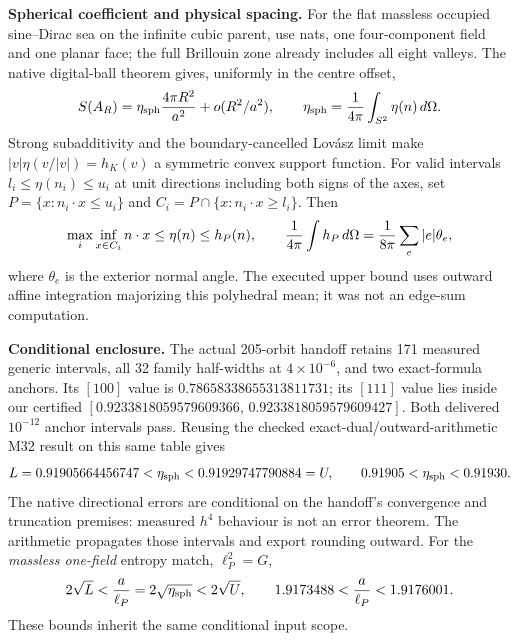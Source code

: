 
\noindent\textbf{Spherical coefficient and physical spacing.}
For the flat massless occupied sine--Dirac sea on the infinite cubic
parent, use nats, one four-component field and one planar face; the full
Brillouin zone already includes all eight valleys. The native digital-ball
theorem gives, uniformly in the centre offset,
\[
 S(A_R)=\eta_{\rm sph}{4\pi R^2\over a^2}+o(R^2/a^2),\qquad
 \eta_{\rm sph}={1\over4\pi}\int_{S^2}\eta(n)\,d\Omega .
\]
Strong subadditivity and the boundary-cancelled Lov\'asz
limit make $|v|\eta(v/|v|)=h_K(v)$ a symmetric convex support function.
For valid intervals $l_i\leq\eta(n_i)\leq u_i$ at unit directions
including both signs of the axes, set
$P=\{x:n_i\cdot x\leq u_i\}$ and
$C_i=P\cap\{x:n_i\cdot x\geq l_i\}$. Then
\[
 \max_i\inf_{x\in C_i}n\cdot x\leq\eta(n)\leq h_P(n),\qquad
 {1\over4\pi}\int h_P\,d\Omega={1\over8\pi}\sum_e |e|\theta_e,
\]
where $\theta_e$ is the exterior normal angle. The executed upper bound
uses outward affine integration majorizing this polyhedral mean; it was
not an edge-sum computation.

\textbf{Conditional enclosure.} The actual 205-orbit handoff retains 171 measured
generic intervals, all 32 family half-widths at $4\times10^{-6}$, and two
exact-formula anchors. Its $[100]$ value is
$0.78658338655313811731$; its $[111]$ value lies inside our certified
$[0.9233818059579609366,\,0.9233818059579609427]$.
Both delivered $10^{-12}$ anchor intervals pass. Reusing the checked
exact-dual/outward-arithmetic M32 result on this same table gives
\[
 L=0.91905664456747<\eta_{\rm sph}<0.91929747790884=U,
 \qquad 0.91905<\eta_{\rm sph}<0.91930 .
\]
The native directional errors are conditional on the handoff's convergence
and truncation premises: measured $h^4$ behaviour is not an error theorem.
The arithmetic propagates those intervals and export rounding outward.
For the \emph{massless one-field} entropy match, $\ell_P^2=G$,
\[
 2\sqrt L<{a\over\ell_P}=2\sqrt{\eta_{\rm sph}}<2\sqrt U,
 \qquad 1.9173488<{a\over\ell_P}<1.9176001 .
\]
These bounds inherit the same conditional input scope.

